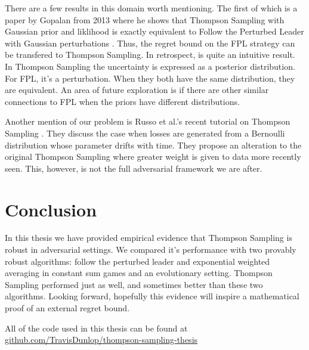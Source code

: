 \documentclass[10pt,a4paper]{article} %
\begin{document}
	There are a few results in this domain worth mentioning.  The first of which is a paper by Gopalan from 2013 where he shows that Thompson Sampling with Gaussian prior and liklihood is exactly equivalent to Follow the Perturbed Leader with Gaussian perturbations \cite{FPL_TS_Gaussian}.  Thus, the regret bound on the FPL strategy can be transfered to Thompson Sampling.  In retrospect, is quite an intuitive result.  In Thompson Sampling the uncertainty is expressed as a posterior distribution. For FPL, it's a perturbation.  When they both have the same distribution, they are equivalent. 	An area of future exploration is if there are other similar connections to FPL when the priors have different distributions.
	
	Another mention of our problem is Russo et al.'s recent tutorial on Thompson Sampling \cite{Russo_TS}.  They discuss the case when losses are generated from a Bernoulli distribution whose parameter drifts with time.  They propose an alteration to the original Thompson Sampling where greater weight is given to data more recently seen.  This, however, is not the full adversarial framework we are after.

	\section{Conclusion}
	
	In this thesis we have provided empirical evidence that Thompson Sampling is robust in adversarial settings.  We compared it's performance with two provably robust algorithms: follow the perturbed leader and exponential weighted averaging in constant sum games and an evolutionary setting.  Thompson Sampling performed just as well, and sometimes better than these two algorithms.  Looking forward, hopefully this evidence will inspire a mathematical proof of an external regret bound.
	
	All of the code used in this thesis can be found at \url{github.com/TravisDunlop/thompson-sampling-thesis}
	
	
	\nocite{*}
	
	
\end{document}
